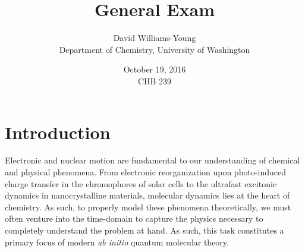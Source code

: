 \documentclass[12pt]{article}
\title{General Exam}
\date{October 19, 2016 \\ CHB 239}
\author{David Williams-Young\\ Department of Chemistry, University of Washington}
\begin{document}
\maketitle


\newpage
\section{Introduction}

Electronic and nuclear motion are fundamental to our understanding of chemical
and physical phenomena. From electronic reorganization upon photo-induced charge
transfer in the chromophores of solar cells to the ultrafast excitonic dynamics
in nanocrystalline materials, molecular dynamics lies at the heart of chemistry.
As such, to properly model these phenomena theoretically, we must often venture
into the time-domain to capture the physics necessary to completely understand
the problem at hand. As such, this task constitutes a primary focus of modern
\emph{ab initio} quantum molecular theory. 
\end{document}
